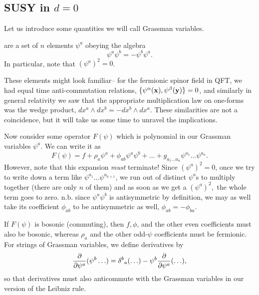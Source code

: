 \subsection*{SUSY in $d=0$}
Let us introduce some quantities we will call Grassman variables.
\begin{defn}
     are a set of $n$ elements $\psi^a$ obeying the algebra
    \begin{equation}
        \psi^a \psi^b = -\psi^b \psi^a.
    \end{equation}
    In particular, note that $(\psi^a)^2 = 0$.
\end{defn}
These elements might look familiar-- for the fermionic spinor field in QFT, we had equal time anti-commutation relations, $\set{\psi^\alpha(\vec x),\psi^\beta(\vec y)}=0$, and similarly in general relativity we saw that the appropriate multiplication law on one-forms was the wedge product, $dx^a \wedge dx^b = -dx^b \wedge dx^a$. These similarities are not a coincidence, but it will take us some time to unravel the implications.

Now consider some operator $F(\psi)$ which is polynomial in our Grassman variables $\psi^a$. We can write it as
\begin{equation}
    F(\psi)=f+\rho_a \psi^a + \phi_{ab} \psi^a \psi^b + \ldots + g_{a_1 \ldots a_n} \psi^{a_1}\ldots \psi^{a_n}.
\end{equation}
However, note that this expansion \emph{must} terminate! Since $(\psi^a)^2=0$, once we try to write down a term like $\psi^{a_1}\ldots \psi^{a_{n+1}}$, we run out of distinct $\psi^a$s to multiply together (there are only $n$ of them) and as soon as we get a $(\psi^a)^2,$ the whole term goes to zero. n.b. since $\psi^a \psi^b$ is antisymmetric by definition, we may as well take its coefficient $\phi_{ab}$ to be antisymmetric as well, $\phi_{ab}=-\phi_{ba}$.

If $F(\psi)$ is bosonic (commuting), then $f, \phi$, and the other even coefficients must also be bosonic, whereas $\rho_a$ and the other odd-$\psi$ coefficients must be fermionic. For strings of Grassman variables, we define derivatives by
\begin{equation}
    \P{}{\psi^a}(\psi^b \ldots)=\delta^b{}_a (\ldots)-\psi^b \P{}{\psi^a}(\ldots),
\end{equation}
so that derivatives must also anticommute with the Grassman variables in our version of the Leibniz rule.